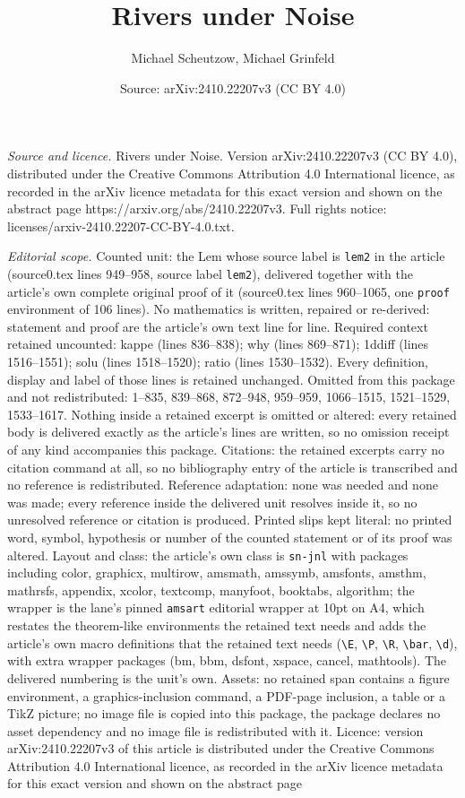 \documentclass[10pt,a4paper]{amsart}
\title[Rivers under Noise]{Rivers under Noise}
\author{Michael Scheutzow, Michael Grinfeld}
\date{Source: arXiv:2410.22207v3 (CC BY 4.0)}
\begin{document}
\maketitle

\noindent\emph{Source and licence.} Rivers under Noise. Version arXiv:2410.22207v3 (CC BY 4.0), distributed under the Creative Commons Attribution 4.0 International licence, as recorded in the arXiv licence metadata for this exact version and shown on the abstract page https://arxiv.org/abs/2410.22207v3. Full rights notice: licenses/arxiv-2410.22207-CC-BY-4.0.txt.\par\smallskip

\noindent\textit{Editorial scope.} Counted unit: the Lem whose source label is \texttt{lem2} in the article (source0.tex lines 949--958, source label \texttt{lem2}), delivered together with the article's own complete original proof of it (source0.tex lines 960--1065, one \texttt{proof} environment of 106 lines). No mathematics is written, repaired or re-derived: statement and proof are the article's own text line for line. Required context retained uncounted: kappe (lines 836--838); why (lines 869--871); 1ddiff (lines 1516--1551); solu (lines 1518--1520); ratio (lines 1530--1532). Every definition, display and label of those lines is retained unchanged. Omitted from this package and not redistributed: 1--835, 839--868, 872--948, 959--959, 1066--1515, 1521--1529, 1533--1617. Nothing inside a retained excerpt is omitted or altered: every retained body is delivered exactly as the article's lines are written, so no omission receipt of any kind accompanies this package. Citations: the retained excerpts carry no citation command at all, so no bibliography entry of the article is transcribed and no reference is redistributed. Reference adaptation: none was needed and none was made; every reference inside the delivered unit resolves inside it, so no unresolved reference or citation is produced. Printed slips kept literal: no printed word, symbol, hypothesis or number of the counted statement or of its proof was altered. Layout and class: the article's own class is \texttt{sn-jnl} with packages including color, graphicx, multirow, amsmath, amssymb, amsfonts, amsthm, mathrsfs, appendix, xcolor, textcomp, manyfoot, booktabs, algorithm; the wrapper is the lane's pinned \texttt{amsart} editorial wrapper at 10pt on A4, which restates the theorem-like environments the retained text needs and adds the article's own macro definitions that the retained text needs (\texttt{\textbackslash E}, \texttt{\textbackslash P}, \texttt{\textbackslash R}, \texttt{\textbackslash bar}, \texttt{\textbackslash d}), with extra wrapper packages (bm, bbm, dsfont, xspace, cancel, mathtools). The delivered numbering is the unit's own. Assets: no retained span contains a figure environment, a graphics-inclusion command, a PDF-page inclusion, a table or a TikZ picture; no image file is copied into this package, the package declares no asset dependency and no image file is redistributed with it. Licence: version arXiv:2410.22207v3 of this article is distributed under the Creative Commons Attribution 4.0 International licence, as recorded in the arXiv licence metadata for this exact version and shown on the abstract page 
\end{document}

